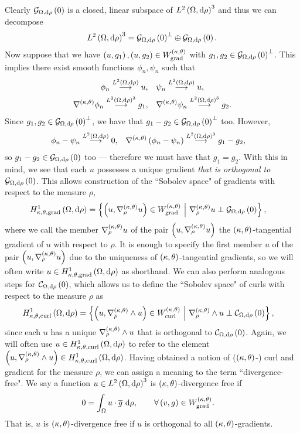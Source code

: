 Clearly $\gradZero{\ddom}{\rho}$ is a closed, linear subspace of $\ltwo{\ddom}{\rho}^3$ and thus we can decompose 
\begin{align*}
	\ltwo{\ddom}{\rho}^3 = \gradZero{\ddom}{\rho}^{\perp} \oplus \gradZero{\ddom}{\rho}.
\end{align*}
Now suppose that we have $\bracs{u,g_1}, \bracs{u,g_2}\in W^{\kt}_{\mathrm{grad}}$ with $g_1, g_2\in\gradZero{\ddom}{\rho}^\perp$.
This implies there exist smooth functions $\phi_n, \psi_n$ such that
\begin{align*}
	\phi_n \lconv{\ltwo{\ddom}{\rho}} u, &\quad \psi_n \lconv{\ltwo{\ddom}{\rho}} u, \\
	\ktgrad\phi_n \lconv{\ltwo{\ddom}{\rho}^3} g_1, &\quad \ktgrad\psi_n \lconv{\ltwo{\ddom}{\rho}^3} g_2.
\end{align*}
Since $g_1, g_2\in \gradZero{\ddom}{\rho}^{\perp}$, we have that $g_1-g_2\in \gradZero{\ddom}{\rho}^{\perp}$ too.
However, 
\begin{align*}
	\phi_n - \psi_n \lconv{\ltwo{\ddom}{\rho}} 0, &\quad \ktgrad\bracs{\phi_n-\psi_n} \lconv{\ltwo{\ddom}{\rho}^3} g_1 - g_2,
\end{align*}
so $g_1 - g_2\in \gradZero{\ddom}{\rho}$ too --- therefore we must have that $g_1=g_2$.
With this in mind, we see that each $u$ possesses a unique gradient \emph{that is orthogonal to} $\gradZero{\ddom}{\rho}$.
This allows construction of the ``Sobolev space" of gradients with respect to the measure $\rho$,
\begin{align*}
	\ktgradSob{\ddom}{\rho} &= \clbracs{ \bracs{u, \ktgrad_{\rho}u}\in W^{\kt}_{\mathrm{grad}} \setVert \ktgrad_{\rho}u \perp \gradZero{\ddom}{\rho} },
\end{align*}
where we call the member $\ktgrad_{\rho}u$ of the pair $\bracs{u, \ktgrad_{\rho}u}$ the $\kt$-tangential gradient of $u$ with respect to $\rho$.
It is enough to specify the first member $u$ of the pair $\bracs{u, \ktgrad_{\rho}u}$ due to the uniqueness of $\kt$-tangential gradients, so we will often write $u\in\ktgradSob{\ddom}{\rho}$ as shorthand.
We can also perform analogous steps for $\curlZero{\ddom}{\rho}$, which allows us to define the ``Sobolev space" of curls with respect to the measure $\rho$ as
\begin{align*}
	\ktcurlSob{\ddom}{\rho} &= \clbracs{ \bracs{u, \ktcurl{\rho}u}\in W^{\kt}_{\mathrm{curl}} \setVert \ktcurl{\rho}u \perp \curlZero{\ddom}{\rho} },
\end{align*}
since each $u$ has a unique $\ktcurl{\rho}u$ that is orthogonal to $\curlZero{\ddom}{\rho}$.
Again, we will often use $u\in\ktcurlSob{\ddom}{\rho}$ to refer to the element $\bracs{u, \ktcurl{\rho}u}\in\ktcurlSob{\ddom}{\rho}$.
Having obtained a notion of ($\kt$-) curl and gradient for the measure $\rho$, we can assign a meaning to the term ``divergence-free".
We say a function $u\in\ltwo{\ddom}{\rho}^3$ is $\kt$-divergence free if 
\begin{align*}
	0 &= \integral{\ddom}{ u\cdot\overline{g} }{\rho}, \qquad\forall \bracs{v,g}\in W^{\kt}_{\mathrm{grad}}.
\end{align*}
That is, $u$ is $\kt$-divergence free if $u$ is orthogonal to all $\kt$-gradients.

